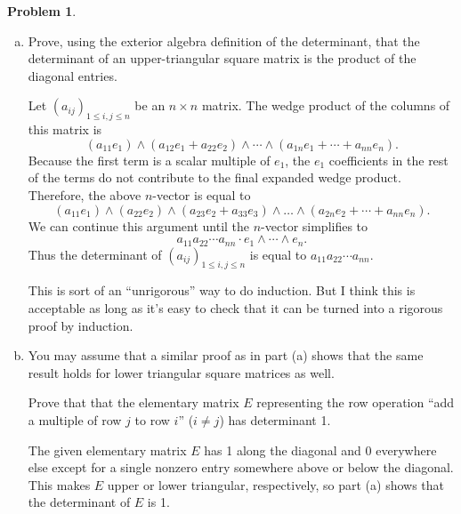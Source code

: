 \documentclass[11pt,oneside]{amsart}
\theoremstyle{definition}
\newtheorem{problem}{Problem}
\begin{document}
    \begin{problem}
        \leavevmode\begin{enumerate}[(a)]
            \item Prove, using the exterior algebra definition of the determinant, that the determinant of an upper-triangular square matrix is the product of the diagonal entries.
            \begin{solution}
                Let $(a_{ij})_{1\leq i,j\leq n}$ be an $n\times n$ matrix.  The wedge product of the columns of this matrix is
                \[(a_{11}e_1)\wedge(a_{12}e_1+a_{22}e_2)\wedge\cdots\wedge(a_{1n}e_1+\cdots+a_{nn}e_n).\]
                Because the first term is a scalar multiple of $e_1$, the $e_1$ coefficients in the rest of the terms do not contribute to the final expanded wedge product. Therefore, the above $n$-vector is equal to
                \[(a_{11}e_1)\wedge(a_{22}e_2)\wedge(a_{23}e_2+a_{33}e_3)\wedge\dots\wedge (a_{2n}e_2+\cdots+a_{nn}e_n).\]
                We can continue this argument until the $n$-vector simplifies to
                \[a_{11}a_{22}\cdots a_{nn}\cdot e_1\wedge\cdots\wedge e_n.\]
                Thus the determinant of $(a_{ij})_{1\leq i,j\leq n}$ is equal to $a_{11}a_{22}\cdots a_{nn}$.

                This is sort of an ``unrigorous'' way to do induction. But I think this is acceptable as long as it's easy to check that it can be turned into a rigorous proof by induction.
            \end{solution}
            \item You may assume that a similar proof as in part (a) shows that the same result holds for lower triangular square matrices as well.
            
            Prove that that the elementary matrix $E$ representing the row operation ``add a multiple of row $j$ to row $i$'' ($i\neq j$) has determinant 1.
            \begin{solution}
                The given elementary matrix $E$ has 1 along the diagonal and 0 everywhere else except for a single nonzero entry somewhere above or below the diagonal. This makes $E$ upper or lower triangular, respectively, so part (a) shows that the determinant of $E$ is 1.
            \end{solution}
        \end{enumerate}
    \end{problem}
\end{document}
